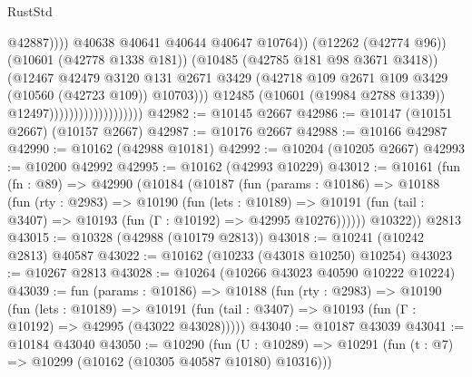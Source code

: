 \begin{lexlean}{RustStd}
\begin{coremodule}
                                                        @42887))))
                                                @40638
                                                @40641
                                                @40644
                                                @40647
                                                @10764))
                                            (@12262 (@42774 @96))
                                            (@10601 (@42778 @1338 @181))
                                            (@10485 (@42785 @181 @98 @3671 @3418))
                                            (@12467
                                              @42479
                                              @3120
                                              @131
                                              @2671
                                              @3429
                                              (@42718
                                                @109
                                                @2671
                                                @109
                                                @3429
                                                (@10560 (@42723 @109))
                                                @10703)))
                                          @12485
                                          (@10601 (@19984 @2788 @1339))
                                          @12497)))))))))))))))))))
@42982 := @10145 @2667
@42986 := @10147 (@10151 @2667) (@10157 @2667)
@42987 := @10176 @2667
@42988 := @10166 @42987
@42990 := @10162 (@42988 @10181)
@42992 := @10204 (@10205 @2667)
@42993 := @10200 @42992
@42995 := @10162 (@42993 @10229)
@43012 := @10161
    (fun (fn : @89) =>
    @42990
      (@10184
        (@10187
          (fun (params : @10186) =>
          @10188
            (fun (rty : @2983) =>
            @10190
              (fun (lets : @10189) =>
              @10191 (fun (tail : @3407) => @10193 (fun (Γ : @10192) => @42995 @10276))))))
        @10322))
    @2813
@43015 := @10328 (@42988 (@10179 @2813))
@43018 := @10241 (@10242 @2813) @40587
@43022 := @10162 (@10233 (@43018 @10250) @10254)
@43023 := @10267 @2813
@43028 := @10264 (@10266 @43023 @40590 @10222 @10224)
@43039 := fun (params : @10186) =>
  @10188
    (fun (rty : @2983) =>
    @10190
      (fun (lets : @10189) =>
      @10191 (fun (tail : @3407) => @10193 (fun (Γ : @10192) => @42995 (@43022 @43028)))))
@43040 := @10187 @43039
@43041 := @10184 @43040
@43050 := @10290
    (fun (U : @10289) => @10291 (fun (t : @7) => @10299 (@10162 (@10305 @40587 @10180) @10316)))

\end{coremodule}
\end{lexlean}

